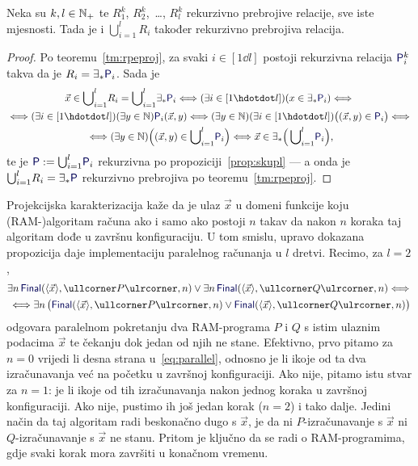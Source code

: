 \begin{propozicija}[{name=[rekurzivna prebrojivost unije rekurzivno prebrojivih relacija]}]\label{pp:unlre}
Neka su $k,l\in{\mathbb N}_+$ te $R_1^k$, $R_2^k$,~\ldots, $R_l^k$ rekurzivno prebrojive relacije, sve iste mjesnosti. Tada je i $\bigcup_{i=1}^l\! R_i$ također rekurzivno prebrojiva relacija.
\end{propozicija}
\begin{proof}
Po teoremu~\ref{tm:rpeproj}, za svaki $i\in[1\dd l]$ postoji rekurzivna relacija $\f P^k_i$ takva da je $R_i=\exists_*\f P_i$. Sada je
\begin{multline}\label{eq:urere}
    \vec x\in\bigcup\nolimits_{i=1}^l\! R_i=\bigcup\nolimits_{i=1}^l\!\exists_*\f P_i\Longleftrightarrow
    (\exists i\in[1\dd l])(x\in\exists_*\f P_i)\Longleftrightarrow{}\\
    {}\Longleftrightarrow(\exists i\in[1\dd l])(\exists y\in\N)\f P_i(\vec x,y)\Longleftrightarrow(\exists y\in\N)(\exists i\in[1\dd l])\bigl((\vec x,y)\in\f P_i\bigr)\Longleftrightarrow{}\\
    {}\Longleftrightarrow
    (\exists y\in\N)\Bigl((\vec x,y)\in\bigcup\nolimits_{i=1}^l\!\f P_i\Bigr)\Longleftrightarrow\vec x\in\exists_*\Bigl(\,\bigcup\nolimits_{i=1}^l\!\f P_i\Bigr)\text,
\end{multline}
te je $\f P:=\bigcup_{i=1}^l\!\f P_i$ rekurzivna po propoziciji~\ref{prop:skupl} --- a onda je $\bigcup_{i=1}^l\! R_i=\exists_*\f P$ rekurzivno prebrojiva po teoremu~\ref{tm:rpeproj}.
\end{proof}

Projekcijska karakterizacija kaže da je ulaz $\vec x$ u domeni funkcije koju (RAM-\!)algoritam računa ako i samo ako postoji $n$ takav da nakon $n$ koraka taj algoritam dođe u završnu konfiguraciju. U tom smislu, upravo dokazana propozicija daje implementaciju paralelnog računanja u $l$ dretvi. Recimo, za $l=2$,
\begin{multline}\label{eq:parallel}
    \exists n\,\f{Final}(\kr{\vec x},\kprog P,n)\lor\exists n\,\f{Final}(\kr{\vec x},\kprog Q,n)\Longleftrightarrow{}\\
    {}\Longleftrightarrow\exists n\,\bigl(\f{Final}(\kr{\vec x},\kprog P,n)\lor\f{Final}(\kr{\vec x},\kprog Q,n)\bigr)
\end{multline}
odgovara paralelnom pokretanju dva RAM-programa $P$ i $Q$ s istim ulaznim podacima $\vec x$ te čekanju dok jedan od njih ne stane. Efektivno, prvo pitamo za $n=0$ vrijedi li desna strana u~\eqref{eq:parallel}, odnosno je li ikoje od ta dva izračunavanja već na početku u završnoj konfiguraciji. Ako nije, pitamo istu stvar za $n=1$: je li ikoje od tih izračunavanja nakon jednog koraka u završnoj konfiguraciji. Ako nije, pustimo ih još jedan korak ($n=2$) i tako dalje. Jedini način da taj algoritam radi beskonačno dugo s $\vec x$, je da ni $P$-izračunavanje s $\vec x$ ni $Q$-izračunavanje s $\vec x$ ne stanu. Pritom je ključno da se radi o RAM-programima, gdje svaki korak mora završiti u konačnom vremenu.

